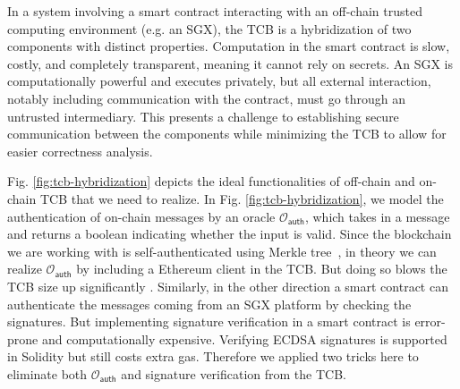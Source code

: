 In a system involving a smart contract interacting with an off-chain trusted computing environment (e.g. an SGX),
the TCB is a hybridization of two components with distinct properties.
Computation in the smart contract is slow, costly, and completely transparent, meaning it cannot rely on secrets.
An SGX is computationally powerful and executes privately, but all external interaction, notably including communication with the contract, must go through an untrusted intermediary.
This presents a challenge to establishing secure communication between the components while minimizing the TCB to allow for easier correctness analysis.


Fig. \ref{fig:tcb-hybridization} depicts the
ideal functionalities of off-chain and on-chain TCB that we need to realize.
In Fig. \ref{fig:tcb-hybridization}, we model the authentication of on-chain
messages by an oracle $\mathcal{O}_\textsf{auth}$, which takes in a message
and returns a boolean indicating whether the input is valid.
Since the blockchain we are working with is self-authenticated using Merkle
tree~, in theory we can realize $\mathcal{O}_\textsf{auth}$
by including a Ethereum client in the TCB. But doing so blows the TCB size up 
significantly .
Similarly, in the other direction a smart contract can
authenticate the messages coming from an SGX platform by checking the
signatures. But implementing
signature verification in a smart contract is error-prone and 
computationally expensive. Verifying ECDSA signatures
is supported in Solidity  but still costs extra gas.
Therefore we applied two tricks here to eliminate both $\mathcal{O}_\textsf{auth}$
and signature verification from the TCB.


